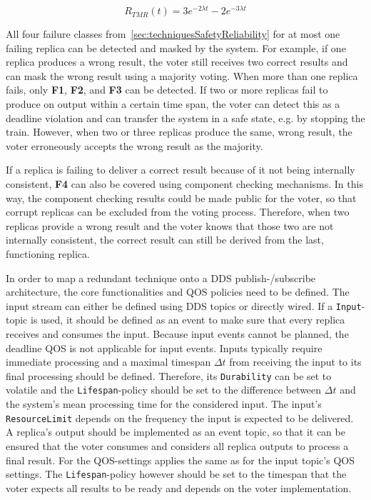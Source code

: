 \begin{equation}
R_{TMR}(t) = 3e^{-2 \lambda t} - 2e^{-3 \lambda t}
\end{equation}

All four failure classes from~\autoref{sec:techniquesSafetyReliability} for at most one failing replica can be detected and masked by the system.
For example, if one replica produces a wrong result, the voter still receives two correct results and can mask the wrong result using a majority voting.
When more than one replica fails, only \textbf{F1}, \textbf{F2}, and \textbf{F3} can be detected.
If two or more replicas fail to produce on output within a certain time span, the voter can detect this as a deadline violation and can transfer the system in a safe state, e.g. by stopping the train.
However, when two or three replicas produce the same, wrong result, the voter erroneously accepts the wrong result as the majority.

If a replica is failing to deliver a correct result because of it not being internally consistent, \textbf{F4} can also be covered using component checking mechanisms.
In this way, the component checking results could be made public for the voter, so that corrupt replicas can be excluded from the voting process.
Therefore, when two replicas provide a wrong result and the voter knows that those two are not internally consistent, the correct result can still be derived from the last, functioning replica.


In order to map a redundant technique onto a \gls*{DDS} publish-/subscribe architecture, the core functionalities and \gls*{QOS} policies need to be defined.
The input stream can either be defined using \gls*{DDS} topics or directly wired.
If a \texttt{Input}-topic is used, it should be defined as an event to make sure that every replica receives and consumes the input.
Because input events cannot be planned, the deadline \gls*{QOS} is not applicable for input events.
Inputs typically require immediate processing and a maximal timespan $\Delta t$ from receiving the input to its final processing should be defined.
Therefore, its \texttt{Durability} can be set to volatile and the \texttt{Lifespan}-policy should be set to the difference between $\Delta t$ and the system's mean processing time for the considered input.
The input's \texttt{ResourceLimit} depends on the frequency the input is expected to be delivered.
\\

A replica's output should be implemented as an event topic, so that it can be ensured that the voter consumes and considers all replica outputs to process a final result.
For the \gls*{QOS}-settings applies the same as for the input topic's \gls*{QOS} settings.
The \texttt{Lifespan}-policy however should be set to the timespan that the voter expects all results to be ready and depends on the voter implementation.

